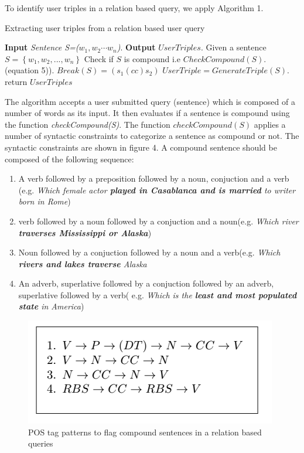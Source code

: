 \documentclass[review]{elsarticle}
\begin{document}
To identify user triples in a relation based  query, we apply Algorithm 1.
\begin{algorithm}
\begin{algorithmic}[1]
\caption{Extracting user triples from a relation based user query}
\STATEx \textbf{Input} \textit{Sentence S=($w_1,w_2\cdots w_n$)}.
\STATEx\textbf{Output} $UserTriples$.
\STATE Given a sentence $S=\left\{w_{1},w_{2},...,w_{n}\right\}$
\STATE Check if $S$ is compound i.e $CheckCompound(S)$. (equation 5)).
\STATE $Break(S)=(s_1(cc)s_2)$
\ELSE
\STATE $UserTriple=GenerateTriple(S)$.
\ENDIF
\STATE return $UserTriples$
\end{algorithmic}
\end{algorithm}
The algorithm accepts a user submitted query (sentence) which is composed of a number of words  as its input. It then evaluates if a sentence is compound  using the function \textit{checkCompound(S)}. The function $checkCompound(S)$  applies a number of  syntactic constraints to categorize a sentence as compound or not. The  syntactic constraints are shown in figure 4.  A compound sentence should be composed of the following sequence: 
\begin{enumerate}
\item A verb followed by a preposition followed by   a noun, conjuction and a verb (e.g. \textit{Which female actor \textbf{played in Casablanca and is married} to writer born in Rome})
\item verb followed by a noun followed by a conjuction and a noun(e.g. \textit{Which river \textbf{traverses Mississippi or Alaska}})
\item Noun followed by a conjuction followed by  a noun and a verb(e.g. \textit{Which \textbf{rivers and lakes traverse} Alaska}
\item An adverb, superlative followed by a conjuction followed by an adverb, superlative followed by a verb( e.g. \textit{Which is the\textbf{ least and most populated state } in America})\end{enumerate}

\begin{figure}[h]
	\centering
		\includegraphics[scale=0.7,angle=0]{noma.png}
		\caption{POS tag patterns to flag compound  sentences in a relation based queries }
	\label{fig:example2}
\end{figure}
\end{document}
